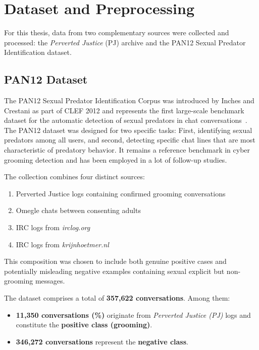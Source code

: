 \chapter{Dataset and Preprocessing}

For this thesis, data from two complementary sources were collected and processed: the \textit{Perverted Justice} (PJ) archive and the PAN12 Sexual Predator Identification dataset.

\section{PAN12 Dataset}
The PAN12 Sexual Predator Identification Corpus was introduced by Inches and Crestani as part of CLEF 2012 and represents the first large-scale benchmark dataset for the automatic detection of sexual predators in chat conversations~\cite{inches2012pan}. The PAN12 dataset was designed for two specific tasks: First, identifying sexual predators among all users, and second, detecting specific chat lines that are most characteristic of predatory behavior. It remains a reference benchmark in cyber grooming detection and has been employed in a lot of follow-up studies.  \cite{inches2012pan}

The collection combines four distinct sources: 

\begin{enumerate}
    \item Perverted Justice logs containing confirmed grooming conversations
    \item Omegle chats between consenting adults
    \item IRC logs from \textit{irclog.org}
    \item IRC logs from \textit{krijnhoetmer.nl}
\end{enumerate}

 This composition was chosen to include both genuine positive cases and potentially misleading negative examples containing sexual explicit but non-grooming messages.  

The dataset comprises a total of \textbf{357{,}622 conversations}.  
Among them:  
\begin{itemize}
    \item \textbf{11{,}350 conversations (\%)} originate from \textit{Perverted Justice (PJ)} logs and constitute the \textbf{positive class (grooming)}.
    \item \textbf{346{,}272 conversations} represent the \textbf{negative class}.
\end{itemize}

